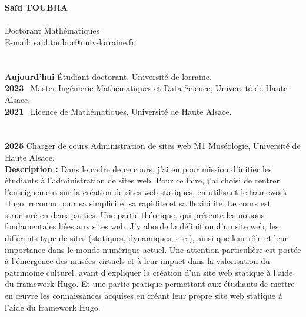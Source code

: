 \documentclass[11pt]{article}
\newcommand{\hcolorrulefill}[1][RoyalBlue]{{\color{#1}\hrulefill}}
\begin{document}
	
	
	\noindent
	\hcolorrulefill \\
	\vspace{-1\baselineskip}
	\vspace{-0.5\baselineskip}
	\hcolorrulefill \\ \vspace{1\baselineskip}
	
	\noindent
	\textbf{\large Saïd TOUBRA} \\ \\
	Doctorant Mathématiques \\ 
	E-mail: \href{mailto:said.toubra@univ-lorraine.fr}{said.toubra@univ-lorraine.fr}\\
	\section*{\color{RoyalBlue}{Formation}}
	\noindent
	\textbf{Aujourd'hui} Étudiant doctorant, Université de lorraine.\\
	\textbf{2023} \ Master Ingénierie Mathématiques et Data Science, Université de Haute-Alsace.\\
	\textbf{2021} \ Licence de Mathématiques, Université de Haute Alsace.
	\section*{\color{RoyalBlue}{Expérience académique}}
	\noindent
	\textbf{2025} Charger de cours Administration de sites web M1 Muséologie, Université de Haute Alsace.\\
	\textbf{Description : }  Dans le cadre de ce cours, j’ai eu pour mission d’initier les étudiants à l’administration de sites web. Pour ce faire, j’ai choisi de centrer
	l’enseignement sur la création de sites web statiques, en utilisant le framework Hugo, reconnu pour sa simplicité, sa rapidité et sa flexibilité. Le cours est structuré
	en deux parties. Une partie théorique, qui présente les notions fondamentales liées aux sites web. J’y aborde la définition d’un site web, les différents type de sites
	(statiques, dynamiques, etc.), ainsi que leur rôle et leur importance dans le monde numérique actuel. Une attention particulière est portée à l’émergence des musées virtuels
	et à leur impact dans la valorisation du patrimoine culturel, avant d’expliquer la création d’un site web statique à l’aide du framework Hugo. Et une partie pratique permettant aux étudiants de mettre en œuvre les connaissances acquises en créant leur propre site web statique à l’aide du framework Hugo.
	
\end{document}
